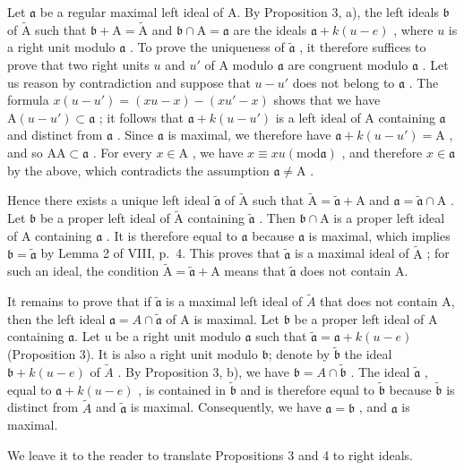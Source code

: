 Let \(\mathfrak{a}\) be a regular maximal left ideal of A. By Proposition 3, a), the left ideals \(\mathfrak{b}\) of \(\widetilde{\mathrm{A}}\) such that \(\mathfrak{b} + \mathrm{A} = \widetilde{\mathrm{A}}\) and \(\mathfrak{b} \cap \mathrm{A} = \mathfrak{a}\) are the ideals \(\mathfrak{a} + k(u - e)\) , where \(u\) is a right unit modulo \(\mathfrak{a}\) . To prove the uniqueness of \(\widetilde{\mathfrak{a}}\) , it therefore suffices to prove that two right units \(u\) and \(u'\) of A modulo \(\mathfrak{a}\) are congruent modulo \(\mathfrak{a}\) . Let us reason by contradiction and suppose that \(u - u'\) does not belong to \(\mathfrak{a}\) . The formula \(x(u - u') = (xu - x) - (xu' - x)\) shows that we have \(\mathrm{A}(u - u') \subset \mathfrak{a}\) ; it follows that \(\mathfrak{a} + k(u - u')\) is a left ideal of A containing \(\mathfrak{a}\) and distinct from \(\mathfrak{a}\) . Since \(\mathfrak{a}\) is maximal, we therefore have \(\mathfrak{a} + k(u - u') = \mathrm{A}\) , and so \(\mathrm{AA} \subset \mathfrak{a}\) . For every \(x \in \mathrm{A}\) , we have \(x \equiv xu (\mathrm{mod} \mathfrak{a})\) , and therefore \(x \in \mathfrak{a}\) by the above, which contradicts the assumption \(\mathfrak{a} \neq \mathrm{A}\) .

Hence there exists a unique left ideal \(\widetilde{\mathfrak{a}}\) of \(\widetilde{\mathrm{A}}\) such that \(\widetilde{\mathrm{A}} = \widetilde{\mathfrak{a}} + \mathrm{A}\) and \(\mathfrak{a} = \widetilde{\mathfrak{a}} \cap \mathrm{A}\) . Let \(\mathfrak{b}\) be a proper left ideal of \(\widetilde{\mathrm{A}}\) containing \(\widetilde{\mathfrak{a}}\) . Then \(\mathfrak{b} \cap \mathrm{A}\) is a proper left ideal of \(\mathrm{A}\) containing \(\mathfrak{a}\) . It is therefore equal to \(\mathfrak{a}\) because \(\mathfrak{a}\) is maximal, which implies \(\mathfrak{b} = \widetilde{\mathfrak{a}}\) by Lemma 2 of VIII, p.~4. This proves that \(\widetilde{\mathfrak{a}}\) is a maximal ideal of \(\widetilde{\mathrm{A}}\) ; for such an ideal, the condition \(\widetilde{\mathrm{A}} = \widetilde{\mathfrak{a}} + \mathrm{A}\) means that \(\widetilde{\mathfrak{a}}\) does not contain A.

It remains to prove that if \(\widetilde{\mathfrak{a}}\) is a maximal left ideal of \(\tilde{A}\) that does not contain A, then the left ideal \(\mathfrak{a} = A \cap \widetilde{\mathfrak{a}}\) of A is maximal. Let \(\mathfrak{b}\) be a proper left ideal of A containing \(\mathfrak{a}\). Let u be a right unit modulo \(\mathfrak{a}\) such that \(\widetilde{\mathfrak{a}} = \mathfrak{a} + k(u - e)\) (Proposition 3). It is also a right unit modulo \(\mathfrak{b}\); denote by \(\widetilde{\mathfrak{b}}\) the ideal \(\mathfrak{b} + k(u - e)\) of \(\tilde{A}\) . By Proposition 3, b), we have \(\mathfrak{b} = A \cap \widetilde{\mathfrak{b}}\) . The ideal \(\widetilde{\mathfrak{a}}\) , equal to \(\mathfrak{a} + k(u - e)\) , is contained in \(\widetilde{\mathfrak{b}}\) and is therefore equal to \(\widetilde{\mathfrak{b}}\) because \(\widetilde{\mathfrak{b}}\) is distinct from \(\tilde{A}\) and \(\widetilde{\mathfrak{a}}\) is maximal. Consequently, we have \(\mathfrak{a} = \mathfrak{b}\) , and \(\mathfrak{a}\) is maximal.

We leave it to the reader to translate Propositions 3 and 4 to right ideals.

